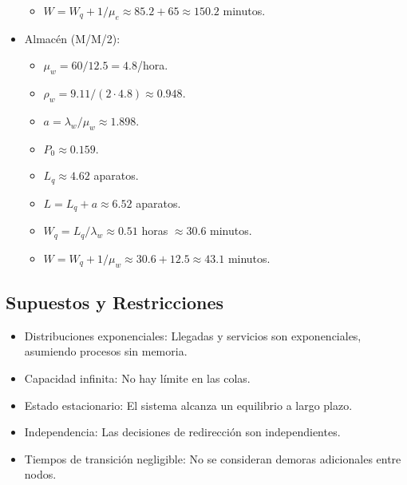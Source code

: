 \documentclass[12pt]{article}
\begin{document}
\begin{itemize}
\begin{itemize}
        \item $W = W_q + 1/\mu_e \approx 85.2 + 65 \approx 150.2$ minutos.
    \end{itemize}
    \item Almacén (M/M/2):
    \begin{itemize}
        \item $\mu_w = 60/12.5 = 4.8$/hora.
        \item $\rho_w = 9.11/(2 \cdot 4.8) \approx 0.948$.
        \item $a = \lambda_w/\mu_w \approx 1.898$.
        \item $P_0 \approx 0.159$.
        \item $L_q \approx 4.62$ aparatos.
        \item $L = L_q + a \approx 6.52$ aparatos.
        \item $W_q = L_q/\lambda_w \approx 0.51$ horas $\approx 30.6$ minutos.
        \item $W = W_q + 1/\mu_w \approx 30.6 + 12.5 \approx 43.1$ minutos.
    \end{itemize}
\end{itemize}

\subsection{Supuestos y Restricciones}
\begin{itemize}
    \item Distribuciones exponenciales: Llegadas y servicios son exponenciales, asumiendo procesos sin memoria.
    \item Capacidad infinita: No hay límite en las colas.
    \item Estado estacionario: El sistema alcanza un equilibrio a largo plazo.
    \item Independencia: Las decisiones de redirección son independientes.
    \item Tiempos de transición negligible: No se consideran demoras adicionales entre nodos.
\end{itemize}
\end{document}

